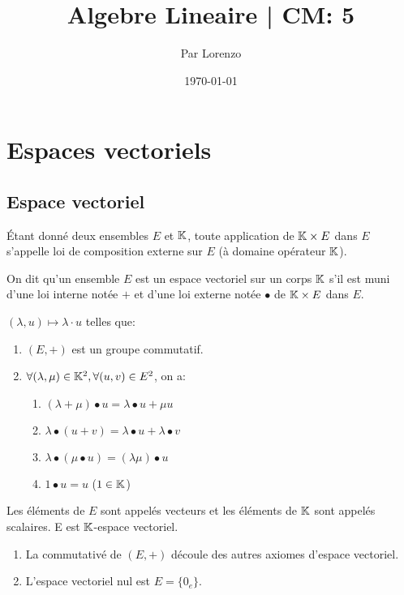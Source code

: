 \documentclass[a4paper, 12pt]{article}
\title{Algebre Lineaire | CM: 5}
\author{Par Lorenzo}
\date{\today}
\begin{document}
\maketitle

\section{Espaces vectoriels}

\subsection{Espace vectoriel}

\begin{definition}
    Étant donné deux ensembles $E$ et $\mathbb{K}$, toute application de $\mathbb{K} \times E$ dans $E$ s'appelle loi de composition externe sur $E$ (à domaine opérateur $\mathbb{K}$).
\end{definition}

\begin{definition}
    On dit qu'un ensemble $E$ est un espace vectoriel sur un corps $\mathbb{K}$ s'il est muni d'une loi interne notée $+$
    et d'une loi externe notée $\bullet$ de $\mathbb{K} \times E$ dans $E$.
    
    $(\lambda, u) \mapsto \lambda \cdot u$ telles que:
    
    \begin{enumerate}
        \item $(E, +)$ est un groupe commutatif.
        \item $\forall (\lambda, \mu) \in \mathbb{K}^2, \forall (u, v) \in E^2$, on a:
        \begin{enumerate}
            \item $(\lambda + \mu) \bullet u = \lambda \bullet u + \mu u$
            \item $\lambda \bullet (u + v) = \lambda \bullet u + \lambda \bullet v$
            \item $\lambda \bullet (\mu \bullet u) = (\lambda \mu) \bullet u$
            \item $1 \bullet u = u$ ($1 \in \mathbb{K}$)
        \end{enumerate}
    \end{enumerate}

    Les éléments de $E$ sont appelés vecteurs et les éléments de $\mathbb{K}$ sont appelés scalaires.
    E est $\mathbb{K}$-espace vectoriel.
\end{definition}

\begin{definition}
    \begin{enumerate}
        \item La commutativé de $(E, +)$ découle des autres axiomes d'espace vectoriel.
        \item L'espace vectoriel nul est $E = \{0_e\}$.
    \end{enumerate}
\end{definition}
\end{document}
